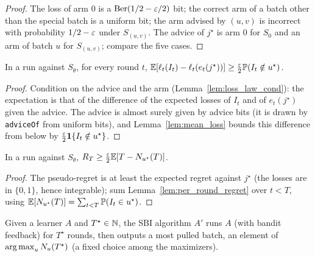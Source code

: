 \begin{proof}
  \leanok
  The loss of arm $0$ is a $\mathrm{Ber}(1/2 - \varepsilon/2)$ bit; the correct arm of a batch other than
  the special batch is a uniform bit; the arm advised by $(u, v)$ is incorrect with probability
  $1/2 - \varepsilon$ under $S_{(u,v)}$. The advice of $j^\star$ is arm $0$ for $S_0$ and an arm of batch
  $u$ for $S_{(u, v)}$; compare the five cases.
\end{proof}

\begin{lemma}
  \label{lem:per_round_regret}
  \leanok
  In a run against $S_\theta$, for every round $t$,
  $\mathbb{E}[\ell_t(I_t) - \ell_t(e_t(j^\star))] \ge \frac{\varepsilon}{2} \mathbb{P}(I_t \notin u^\star)$.
\end{lemma}

\begin{proof}
  \leanok
  Condition on the advice and the arm (Lemma~\ref{lem:loss_law_cond}): the expectation is that of
  the difference of the expected losses of $I_t$ and of $e_t(j^\star)$ given the advice. The advice
  is almost surely given by advice bits (it is drawn by \texttt{adviceOf} from uniform bits), and
  Lemma~\ref{lem:mean_loss} bounds this difference from below by $\frac{\varepsilon}{2}
  \mathbf{1}\{I_t \notin u^\star\}$.
\end{proof}

\begin{lemma}
  \label{lem:regret_ge_pulls}
  \leanok
  In a run against $S_\theta$, $R_T \ge \frac{\varepsilon}{2} \mathbb{E}[T - N_{u^\star}(T)]$.
\end{lemma}

\begin{proof}
  \leanok
  The pseudo-regret is at least the expected regret against $j^\star$ (the losses are in
  $\{0, 1\}$, hence integrable); sum Lemma~\ref{lem:per_round_regret} over $t < T$, using
  $\mathbb{E}[N_{u^\star}(T)] = \sum_{t < T} \mathbb{P}(I_t \in u^\star)$.
\end{proof}

\begin{definition}
  \label{def:sbi_of_learner}
  \leanok
  Given a learner $A$ and $T^\star \in \mathbb{N}$, the SBI algorithm $A'$ runs $A$ (with bandit feedback)
  for $T^\star$ rounds, then outputs a most pulled batch, an element of
  $\operatorname*{arg\,max}_{u} N_u(T^\star)$ (a fixed choice among the maximizers).
\end{definition}

